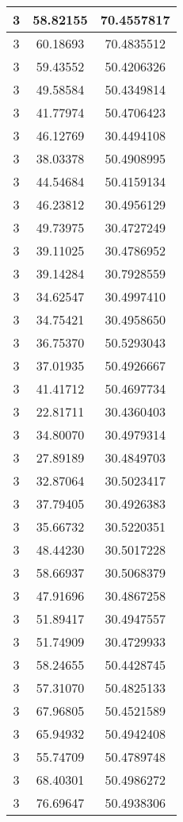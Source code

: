 \documentclass[
]{book}
\begin{document}
\begin{tabular}{c|c|c}
\hline
3 & 58.82155 & 70.4557817\\
\hline
3 & 60.18693 & 70.4835512\\
\hline
3 & 59.43552 & 50.4206326\\
\hline
3 & 49.58584 & 50.4349814\\
\hline
3 & 41.77974 & 50.4706423\\
\hline
3 & 46.12769 & 30.4494108\\
\hline
3 & 38.03378 & 50.4908995\\
\hline
3 & 44.54684 & 50.4159134\\
\hline
3 & 46.23812 & 30.4956129\\
\hline
3 & 49.73975 & 30.4727249\\
\hline
3 & 39.11025 & 30.4786952\\
\hline
3 & 39.14284 & 30.7928559\\
\hline
3 & 34.62547 & 30.4997410\\
\hline
3 & 34.75421 & 30.4958650\\
\hline
3 & 36.75370 & 50.5293043\\
\hline
3 & 37.01935 & 50.4926667\\
\hline
3 & 41.41712 & 50.4697734\\
\hline
3 & 22.81711 & 30.4360403\\
\hline
3 & 34.80070 & 30.4979314\\
\hline
3 & 27.89189 & 30.4849703\\
\hline
3 & 32.87064 & 30.5023417\\
\hline
3 & 37.79405 & 30.4926383\\
\hline
3 & 35.66732 & 30.5220351\\
\hline
3 & 48.44230 & 30.5017228\\
\hline
3 & 58.66937 & 30.5068379\\
\hline
3 & 47.91696 & 30.4867258\\
\hline
3 & 51.89417 & 30.4947557\\
\hline
3 & 51.74909 & 30.4729933\\
\hline
3 & 58.24655 & 50.4428745\\
\hline
3 & 57.31070 & 50.4825133\\
\hline
3 & 67.96805 & 50.4521589\\
\hline
3 & 65.94932 & 50.4942408\\
\hline
3 & 55.74709 & 50.4789748\\
\hline
3 & 68.40301 & 50.4986272\\
\hline
3 & 76.69647 & 50.4938306\\

\end{tabular}
\end{document}

